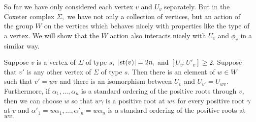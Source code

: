 \documentclass[class=book, crop=false,12 pt]{standalone}
\begin{document}
So far we have only considered each vertex $v$ and $U_v$ separately. But in the Coxeter complex $\Sigma,$ we have not only a collection of vertices, but an action of the group $W$ on the vertices which behaves nicely with properties like the type of a vertex. We will show that the $W$ action also interacts nicely with $U_v$ and $\phi_v$ in a similar way.

\begin{lemma}
	\label{lem:resp_order}
	Suppose $v$ is a vertex of $\Sigma$ of type $s,$ $|\mathrm{st}(v)|=2n,$ and $[U_v:U'_v]\ge 2.$ Suppose that $v'$ is any other vertex of $\Sigma$ of type $s.$ Then there is an element of $w\in W$ such that $v'=wv$ and there is an isomorphism between $U_v$ and $U_{v'}=U_{wv}.$ Furthermore, if $\alpha_1,\dots,\alpha_n$ is a standard ordering of the positive roots through $v,$ then we can choose $w$ so that $w\gamma$ is a positive root at $wv$ for every positive root $\gamma$ at $v$ and $\alpha'_1=w\alpha_1,\dots,\alpha'_n=w\alpha_n$ is a standard ordering of the positive roots at $wv.$
\end{lemma}
\end{document}
